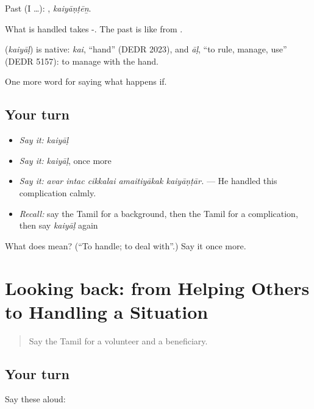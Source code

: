 Past (I …): , \emph{kaiyāṇṭēṉ}.

What is handled takes -. The past  is like  from .

\begin{cousinweb}
\textbf{} (\emph{kaiyāḷ}) is native: \emph{kai}, \textquotedblleft{}hand\textquotedblright{} (DEDR 2023), and \emph{āḷ}, \textquotedblleft{}to rule, manage, use\textquotedblright{} (DEDR 5157): to manage with the hand.
\end{cousinweb}

\begin{grammarlens}[title={What you've built}]
One more word for saying what happens if.
\end{grammarlens}

\subsection*{Your turn}
\begin{itemize}
\raggedright
  \item \emph{Say it:} \emph{kaiyāḷ}
  \item \emph{Say it:} \emph{kaiyāḷ}, once more
  \item \emph{Say it:} \emph{avar intac cikkalai amaitiyākak kaiyāṇṭār.} — He handled this complication calmly.
  \item \emph{Recall:} say the Tamil for a background, then the Tamil for a complication, then say \emph{kaiyāḷ} again
\end{itemize}

\begin{tcolorbox}[breakable,colback=teal!4,colframe=teal!35!black,title={Before you move on}]
What does  mean? (\textquotedblleft{}To handle; to deal with\textquotedblright{}.) Say it once more.
\end{tcolorbox}
\section[(dialogue)]{Looking back: from Helping Others to Handling a Situation}

\label{lesson:TA-R385-review-379-385}



\begin{quote}
Say the Tamil for a volunteer and a beneficiary.
\end{quote}

\subsection*{Your turn}
Say these aloud:


